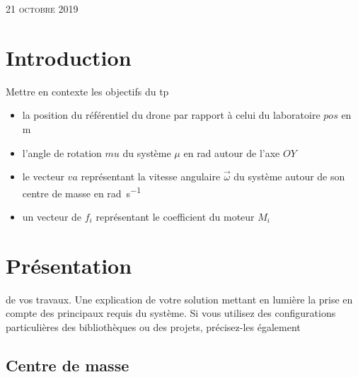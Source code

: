 \documentclass{article}
\begin{document}
\begin{titlepage}
 	\vspace{3cm}
 	
 	
 	
 	\textsc{{\large 21 octobre 2019}}\\[2cm] %
 	\vspace{-1.2cm}

 	\vfill %
 	
 \end{titlepage}
 
 \restoregeometry
 \pagebreak
 
 
\section{Introduction}
Mettre en contexte les objectifs du tp
\begin{itemize}
  \item la position du référentiel du drone par rapport à celui du laboratoire $pos$ en \si{\metre}
  \item l'angle de rotation $mu$ du système $\mu$ en \si{\radian} autour de l'axe $OY$
  \item le vecteur $va$ représentant la vitesse angulaire $\vec{\omega}$ du système autour de son centre de masse en \si{\radian\per\second}
  \item un vecteur de $f_i$ représentant le coefficient du moteur $M_i$
\end{itemize}


\section{Présentation}
de vos travaux. Une explication de votre solution mettant en lumière la prise en compte des
principaux requis du système. Si vous utilisez des configurations particulières des bibliothèques ou des
projets, précisez-les également
\subsection{Centre de masse}
\end{document}
